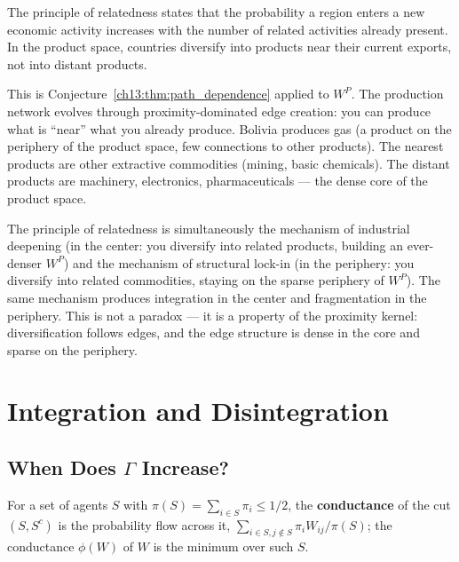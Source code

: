 \documentclass[../structural_economics_book.tex]{subfiles}
\begin{document}
\begin{prebisch}
The principle of relatedness \citep{hidalgo2007product,hidalgo2021economic} states that the probability a region enters a new economic activity increases with the number of related activities already present. In the product space, countries diversify into products near their current exports, not into distant products.

This is Conjecture~\ref{ch13:thm:path_dependence} applied to $W^P$. The production network evolves through proximity-dominated edge creation: you can produce what is ``near'' what you already produce. Bolivia produces gas (a product on the periphery of the product space, few connections to other products). The nearest products are other extractive commodities (mining, basic chemicals). The distant products are machinery, electronics, pharmaceuticals --- the dense core of the product space.

The principle of relatedness is simultaneously the mechanism of industrial deepening (in the center: you diversify into related products, building an ever-denser $W^P$) and the mechanism of structural lock-in (in the periphery: you diversify into related commodities, staying on the sparse periphery of $W^P$). The same mechanism produces integration in the center and fragmentation in the periphery. This is not a paradox --- it is a property of the proximity kernel: diversification follows edges, and the edge structure is dense in the core and sparse on the periphery.
\end{prebisch}


\section{Integration and Disintegration}
\label{ch13:sec:integration}

\subsection{When Does $\Gamma$ Increase?}

For a set of agents $S$ with $\pi(S) = \sum_{i \in S}\pi_i \leq 1/2$, the \textbf{conductance} of the cut $(S, S^c)$ is the probability flow across it, $\sum_{i \in S, j \notin S}\pi_i W_{ij}/\pi(S)$; the conductance $\phi(W)$ of $W$ is the minimum over such $S$.
\end{document}
